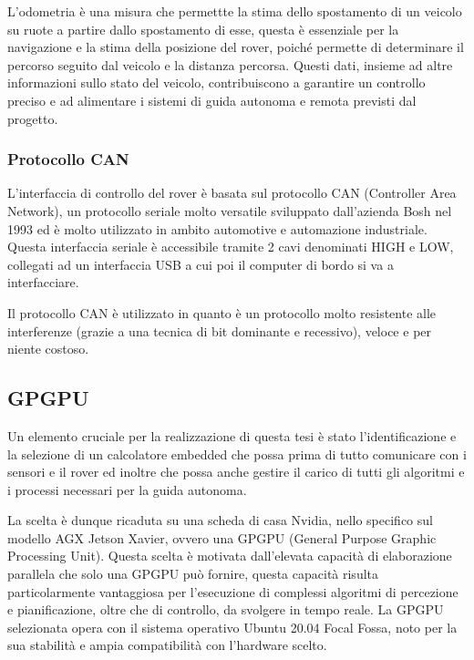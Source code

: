\noindent L'odometria è una misura che permettte la stima dello spostamento di un veicolo su ruote a partire dallo spostamento di esse, questa è essenziale per la navigazione e la stima della posizione del rover, poiché permette di determinare il percorso seguito dal veicolo e la distanza percorsa. Questi dati, insieme ad altre informazioni sullo stato del veicolo, contribuiscono a garantire un controllo preciso e ad alimentare i sistemi di guida autonoma e remota previsti dal progetto.

\subsubsection{Protocollo CAN}
L'interfaccia di controllo del rover è basata sul protocollo CAN (Controller Area Network), un protocollo seriale molto versatile sviluppato dall'azienda Bosh nel 1993 ed è molto utilizzato in ambito automotive e automazione industriale. Questa interfaccia seriale è accessibile tramite 2 cavi denominati HIGH e LOW, collegati ad un interfaccia USB a cui poi il computer di bordo si va a interfacciare.

\noindent Il protocollo CAN è utilizzato in quanto è un protocollo molto resistente alle interferenze (grazie a una tecnica di bit dominante e recessivo), veloce e per niente costoso.  

\subsection{GPGPU}
Un elemento cruciale per la realizzazione di questa tesi è stato l'identificazione e la selezione di un calcolatore embedded che possa prima di tutto comunicare con i sensori e il rover ed inoltre che possa anche gestire il carico di tutti gli algoritmi e i processi necessari per la guida autonoma.

\noindent La scelta è dunque ricaduta su una scheda di casa Nvidia, nello specifico sul modello AGX Jetson Xavier, ovvero una GPGPU (General Purpose Graphic Processing Unit). Questa scelta è motivata dall'elevata capacità di elaborazione parallela che solo una GPGPU può fornire, questa capacità risulta particolarmente vantaggiosa per l'esecuzione di complessi algoritmi di percezione e pianificazione, oltre che di controllo, da svolgere in tempo reale. La GPGPU selezionata opera con il sistema operativo Ubuntu 20.04 Focal Fossa, noto per la sua stabilità e ampia compatibilità con l'hardware scelto.

